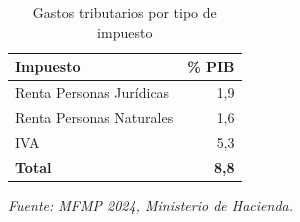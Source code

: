 
\begin{table}[h!]
\centering
\caption{Gastos tributarios por tipo de impuesto}
\label{tab:bentrib}
\begin{tabular}{@{} l r @{}}
\hline
\textbf{Impuesto} & \textbf{\% PIB} \\ \hline
Renta Personas Jur\'idicas & 1,9\\
Renta Personas Naturales & 1,6 \\
IVA & 5,3\\ \hline
\textbf{Total} & \textbf{8,8}\\ \hline
\end{tabular}
\vspace{0.3cm} 
\par\footnotesize{\textit{Fuente: MFMP 2024, Ministerio de Hacienda.}}
\end{table}